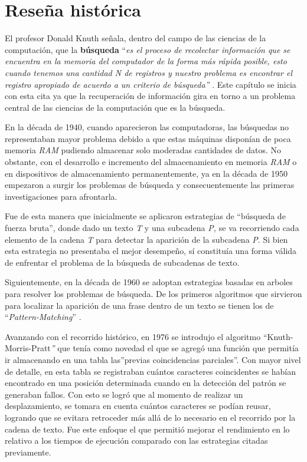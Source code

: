 \documentclass[
  12pt,
  openany]{book}
\begin{document}
\hypertarget{alghist}{%
\section{Reseña histórica}\label{alghist}}

El profesor Donald Knuth señala, dentro del campo de las ciencias de la computación, que la \textbf{búsqueda} ``\emph{es el proceso de recolectar información que se encuentra en la memoria del computador de la forma más rápida posible, esto cuando tenemos una cantidad N de registros y nuestro problema es encontrar el registro apropiado de acuerdo a un criterio de búsqueda''} \citep[p.392]{knuth1997}. Este capítulo se inicia con esta cita ya que la recuperación de información gira en torno a un problema central de las ciencias de la computación que es la búsqueda.

En la década de 1940, cuando aparecieron las computadoras, las búsquedas no representaban mayor problema debido a que estas máquinas disponían de poca memoria \emph{RAM} pudiendo almacenar solo moderadas cantidades de datos. No obstante, con el desarrollo e incremento del almacenamiento en memoria \emph{RAM} o en dispositivos de almacenamiento permanentemente, ya en la década de 1950 empezaron a surgir los problemas de búsqueda y consecuentemente las primeras investigaciones para afrontarla.

Fue de esta manera que inicialmente se aplicaron estrategias de ``búsqueda de fuerza bruta'', donde dado un texto \emph{T} y una subcadena \emph{P,} se va recorriendo cada elemento de la cadena \emph{T} para detectar la aparición de la subcadena \emph{P}. Si bien esta estrategia no presentaba el mejor desempeño, sí constituía una forma válida de enfrentar el problema de la búsqueda de subcadenas de texto.

Siguientemente, en la década de 1960 se adoptan estrategias basadas en arboles para resolver los problemas de búsqueda. De los primeros algoritmos que sirvieron para localizar la aparición de una frase dentro de un texto se tienen los de ``\emph{Pattern-Matching}'' \citep{goodrich2013}.

Avanzando con el recorrido histórico, en 1976 se introdujo el algoritmo ``Knuth-Morris-Pratt\emph{''} que tenía como novedad el que se agregó una función que permitía ir almacenando en una tabla las''previas coincidencias parciales''. Con mayor nivel de detalle, en esta tabla se registraban cuántos caracteres coincidentes se habían encontrado en una posición determinada cuando en la detección del patrón se generaban fallos. Con esto se logró que al momento de realizar un desplazamiento, se tomara en cuenta cuántos caracteres se podían reusar, logrando que se evitara retroceder más allá de lo necesario en el recorrido por la cadena de texto. Fue este enfoque el que permitió mejorar el rendimiento en lo relativo a los tiempos de ejecución comparado con las estrategias citadas previamente.
\end{document}
